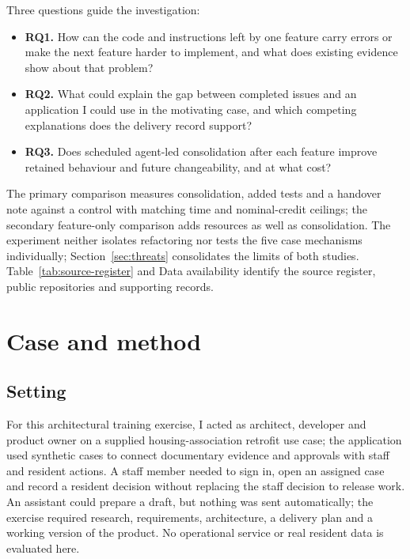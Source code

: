 \documentclass[11pt,a4paper]{article}
\begin{document}
Three questions guide the investigation:

\begin{itemize}[leftmargin=*]
\item \textbf{RQ1.} How can the code and instructions left by one feature
carry errors or make the next feature harder to implement, and what does
existing evidence show about that problem?
\item \textbf{RQ2.} What could explain the gap between completed issues and
an application I could use in the motivating case, and which competing
explanations does the delivery record support?
\item \textbf{RQ3.} Does scheduled agent-led consolidation after each feature
improve retained behaviour and future changeability, and at what cost?
\end{itemize}



The primary comparison measures consolidation, added tests and a handover
note against a control with matching time and nominal-credit ceilings;
the secondary feature-only comparison adds resources as well as
consolidation. The experiment neither isolates refactoring nor tests the
five case mechanisms individually; Section~\ref{sec:threats} consolidates
the limits of both studies.
Table~\ref{tab:source-register} and Data availability identify the source
register, public repositories and supporting records.



\section{Case and method}\label{sec:method}

\subsection{Setting}

For this architectural training exercise, I acted as architect, developer and product owner on a supplied housing-association retrofit use case; the application used synthetic cases to connect documentary evidence
and approvals with staff and resident actions. A staff member
needed to sign in, open an assigned case and record a resident decision
without replacing the staff decision to release work. An assistant could prepare a draft, but nothing was sent automatically; the exercise
required research, requirements, architecture, a delivery plan and a working
version of the product. No operational
service or real resident data is evaluated here.
\end{document}
